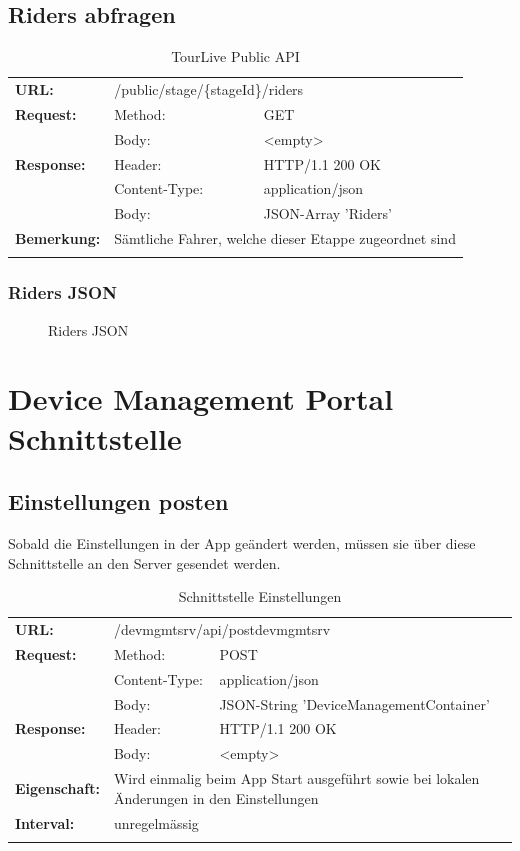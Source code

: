 \subsection{Riders abfragen}
\begin{longtable}{ p{2.5cm} p{3.5cm} p{6cm}}	
	\textbf{URL:} & \multicolumn{2}{l}{/public/stage/\{stageId\}/riders} \\
	\textbf{Request:} & Method: & GET \\
		& Body: & <empty>\\
	\textbf{Response:} &  Header: & HTTP/1.1 200 OK \\
		& Content-Type: & application/json \\
		& Body: & JSON-Array 'Riders'\\
	\textbf{Bemerkung:} & \multicolumn{2}{p{10cm}}{Sämtliche Fahrer, welche dieser Etappe zugeordnet sind} \\ [1ex] 
\caption{TourLive Public API}
\end{longtable}

\subsubsection{Riders JSON}
\begin{figure}[H]
	\centering
	
	\caption{Riders JSON}
\end{figure}

\section{Device Management Portal Schnittstelle}

\subsection{Einstellungen posten}
Sobald die Einstellungen in der App geändert werden, müssen sie über diese Schnittstelle an den Server gesendet werden.

{\renewcommand{\arraystretch}{1}
    \begin{longtable}{ p{2.5cm} p{3.5cm} p{6cm}}
	\textbf{URL:} & \multicolumn{2}{l}{/devmgmtsrv/api/postdevmgmtsrv} \\
	\textbf{Request:} & Method: & POST \\
		& Content-Type: & application/json \\
		& Body: & JSON-String 'DeviceManagementContainer'\\
	\textbf{Response:} &  Header: & HTTP/1.1 200 OK \\
		& Body: & <empty>	\\
	\textbf{Eigenschaft:} & \multicolumn{2}{p{10cm}}{Wird einmalig beim App Start ausgeführt sowie bei lokalen Änderungen in den Einstellungen} \\
	\textbf{Interval:} & \multicolumn{2}{p{10cm}}{unregelmässig} \\
	
\caption{Schnittstelle Einstellungen}
\end{longtable}}

